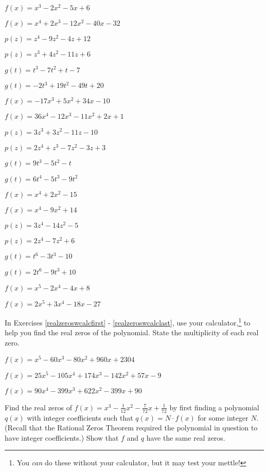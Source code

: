 \begin{shortexenum}[$f(x) = x^{4} + 2x^{3} - 12x^{2} - 40x - 32$]
\item $f(x) = x^{3} - 2x^{2} - 5x + 6$ \label{findrealzerosexerfirst}
\item $f(x) = x^{4} + 2x^{3} - 12x^{2} - 40x - 32$
\item $p(z) = z^{4} - 9z^{2} - 4z + 12$
\item $p(z) = z^{3} + 4z^{2} - 11z + 6$
\item $g(t) = t^{3} - 7t^{2} + t - 7$
\item $g(t) = -2t^{3} + 19t^{2} - 49t + 20$
\item $f(x) = -17x^{3} + 5x^{2} + 34x - 10$
\item $f(x) = 36x^{4} - 12x^{3} - 11x^{2} + 2x + 1$
\item $p(z) = 3z^{3} + 3z^{2} - 11z - 10$
\item $p(z) = 2z^4+z^3-7z^2-3z+3$
\item $g(t) = 9t^{3} - 5t^{2} - t$
\item $g(t) = 6t^{4} - 5t^{3} - 9t^{2}$
\item $f(x) = x^4+2x^2 - 15$
\item $f(x) = x^4-9x^2+14$
\item $p(z) = 3z^4-14z^2-5$
\item $p(z) = 2z^4-7z^2+6$
\item $g(t) = t^6-3t^3-10$
\item $g(t) = 2t^6-9t^3+10$
\item $f(x) = x^5-2x^4-4x+8$
\item $f(x) = 2x^5+3x^4-18x-27$ \label{findrealzerosexerlast}
\end{shortexenum}

In Exercises \ref{realzeroswcalcfirst} - \ref{realzeroswcalclast}, use your calculator,\footnote{You \textit{can} do these without your calculator, but it may test your mettle!} to help you find the real zeros of the polynomial.  State the multiplicity of each real zero.

\begin{exenum}

\item $f(x) = x^{5} - 60x^{3} - 80x^{2} + 960x + 2304$ \label{realzeroswcalcfirst}
\item $f(x) = 25x^{5} - 105x^{4} + 174x^{3} - 142x^{2} + 57x - 9$
\item $f(x) = 90x^{4} - 399x^{3} + 622x^{2} - 399x + 90$ \label{realzeroswcalclast}

\item Find the real zeros of $f(x) = x^{3} - \frac{1}{12}x^{2} - \frac{7}{72}x + \frac{1}{72}$ by first finding a polynomial $q(x)$ with integer coefficients such that $q(x) = N \cdot f(x)$ for some integer $N$.  (Recall that the Rational Zeros Theorem required the polynomial in question to have integer coefficients.) Show that $f$ and $q$ have the same real zeros.

\end{exenum}

